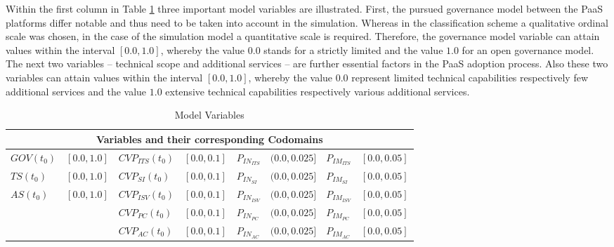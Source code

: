 Within the first column in Table \ref{tab:mvar} three important model variables are illustrated. First, the pursued governance model between the \ac{PaaS} platforms differ notable and thus need to be taken into account in the simulation. Whereas in the classification scheme a qualitative ordinal scale was chosen, in the case of the simulation model a quantitative scale is required. Therefore, the governance model variable can attain values within the interval $[0.0,1.0]$, whereby the value $0.0$ stands for a strictly limited and the value $1.0$ for an open governance model. The next two variables -- technical scope and additional services -- are further essential factors in the \ac{PaaS} adoption process. Also these two variables can attain values within the interval $[0.0,1.0]$, whereby the value $0.0$ represent limited technical capabilities respectively few additional services and the value $1.0$ extensive technical capabilities respectively various additional services.

\newlength{\originalTabcolsep}
\setlength{\originalTabcolsep}{\tabcolsep}
\setlength{\tabcolsep}{1.5mm}

\begin{table}[t]
	\centering
	\begin{tabular}{llllllll}
		\toprule 
		\multicolumn{8}{c}{\footnotesize \textbf{Variables and their corresponding Codomains}} \\ \midrule
		\footnotesize $GOV(t_0)$ & \footnotesize $[0.0,1.0]$ & \footnotesize $CVP_{ITS}(t_0)$ & \footnotesize $[0.0,0.1]$ & \footnotesize $P_{IN_{ITS}}$ & \footnotesize $(0.0,0.025]$ & \footnotesize $P_{IM_{ITS}}$ & \footnotesize $[0.0,0.05]$ \\
		\footnotesize $TS(t_0)$ & \footnotesize $[0.0,1.0]$ & \footnotesize $CVP_{SI}(t_0)$ & \footnotesize $[0.0,0.1]$ & \footnotesize $P_{IN_{SI}}$ & \footnotesize $(0.0,0.025]$ & \footnotesize $P_{IM_{SI}}$ & \footnotesize $[0.0,0.05]$ \\
		\footnotesize $AS(t_0)$ & \footnotesize $[0.0,1.0]$ & \footnotesize $CVP_{ISV}(t_0)$ & \footnotesize $[0.0,0.1]$ & \footnotesize $P_{IN_{ISV}}$ & \footnotesize $(0.0,0.025]$ & \footnotesize $P_{IM_{ISV}}$ & \footnotesize $[0.0,0.05]$ \\
		& & \footnotesize $CVP_{PC}(t_0)$ & \footnotesize $[0.0,0.1]$ & \footnotesize $P_{IN_{PC}}$ & \footnotesize $(0.0,0.025]$ & \footnotesize $P_{IM_{PC}}$ & \footnotesize $[0.0,0.05]$ \\
		& & \footnotesize $CVP_{AC}(t_0)$ & \footnotesize $[0.0,0.1]$ & \footnotesize $P_{IN_{AC}}$ & \footnotesize $(0.0,0.025]$ & \footnotesize $P_{IM_{AC}}$ & \footnotesize $[0.0,0.05]$ \\ \bottomrule
	\end{tabular}
	\caption{Model Variables}
	\label{tab:mvar}
\end{table}

